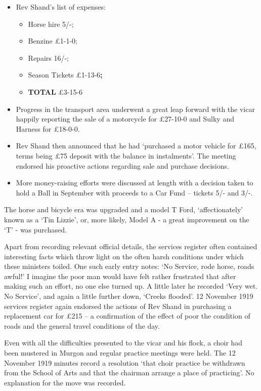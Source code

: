 \begin{itemize}
\item
  Rev Shand's list of expenses:

  \begin{itemize}
  \item
    Horse hire 5/-;
  \item
    Benzine \pounds1-1-0;
  \item
    Repairs 16/-;
  \item
    Season Tickets \pounds1-13-6\textbf{;}
  \item
    \textbf{TOTAL} \pounds3-15-6
  \end{itemize}
\item
  Progress in the transport area underwent a great leap forward with the
  vicar happily reporting the sale of a motorcycle for \pounds27-10-0 and
  Sulky and Harness for \pounds18-0-0.
\item
  Rev Shand then announced that he had `purchased a motor vehicle for
  \pounds165, terms being \pounds75 deposit with the balance in instalments'. The
  meeting endorsed his proactive actions regarding sale and purchase
  decisions.
\item
  More money-raising efforts were discussed at length with a decision
  taken to hold a Ball in September with proceeds to a Car Fund --
  tickets 5/- and 3/-.
\end{itemize}

The horse and bicycle era was upgraded and a model T Ford,
`affectionately' known as a `Tin Lizzie', or, more likely, Model A - a
great improvement on the `T' - was purchased.

Apart from recording relevant official details, the services register
often contained interesting facts which throw light on the often harsh
conditions under which these ministers toiled. One such early entry
notes: `No Service, rode horse, roads awful!' I imagine the poor man
would have felt rather frustrated that after making such an effort, no
one else turned up. A little later he recorded `Very wet. No Service',
and again a little further down, `Creeks flooded'. 12 November 1919
services register again endorsed the actions of Rev Shand in purchasing
a replacement car for \pounds215 -- a confirmation of the effect of poor the
condition of roads and the general travel conditions of the day.

Even with all the difficulties presented to the vicar and his flock, a
choir had been mustered in Murgon and regular practice meetings were
held. The 12 November 1919 minutes record a resolution `that choir
practice be withdrawn from the School of Arts and that the chairman
arrange a place of practicing'. No explanation for the move was
recorded.

